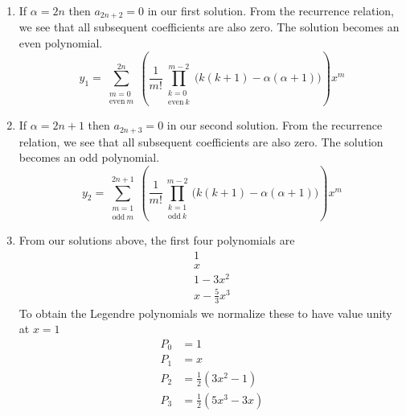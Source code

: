 {\begin{Solution}
\begin{enumerate}
\begin{gather*}
      \\
      \left| x^2 \right| < 1
    \end{gather*}
    Thus we see that the radius of convergence of the series is 1.  We
    knew that the radius of convergence would be at least one, because
    the nearest singularities of the coefficients of
    (\ref{eqn_legendre_eqn_norm}) occur at $x = \pm 1$, a distance of 1
    from the origin.  This implies that the solutions of the equation
    are analytic in the unit circle about $x = 0$.  The radius of
    convergence of the Taylor series expansion of an analytic function
    is the distance to the nearest singularity.
  \item
    If $\alpha = 2 n$ then $a_{2n+2} = 0$ in our first solution. From the
    recurrence relation, we see that all subsequent coefficients are also zero.
    The solution becomes an even polynomial.
    \[
    \boxed{
      y_1 = \sum_{\substack{m = 0 \\ \mathrm{even}\ m}}^{2n} \left( \frac{1}{m!}
        \prod_{\substack{k=0 \\ \mathrm{even}\ k}}^{m-2} \big( k (k+1) - \alpha (\alpha+1) \big) \right) x^m
      }
    \]
  \item
    If $\alpha = 2n+1$ then $a_{2n+3} = 0$ in our second solution. From the
    recurrence relation, we see that all subsequent coefficients are also zero.
    The solution becomes an odd polynomial.
    \[
    \boxed{
      y_2 = \sum_{\substack{m = 1 \\ \mathrm{odd}\ m}}^{2n+1} \left( \frac{1}{m!}
        \prod_{\substack{k=1 \\ \mathrm{odd}\ k}}^{m-2} \big( k (k+1) - \alpha (\alpha+1) \big) \right) x^m
      }
    \]
  \item
    From our solutions above, the first four polynomials are
    \begin{gather*}
      1 \\
      x \\
      1 - 3 x^2 \\
      x - \frac{5}{3} x^3
    \end{gather*}
    To obtain the Legendre polynomials we normalize these to have 
    value unity at $x = 1$
    \begin{align*}
      P_0 &= 1 \\
      P_1 &= x \\
      P_2 &= \frac{1}{2} \left( 3 x^2 - 1 \right) \\
      P_3 &= \frac{1}{2} \left( 5 x^3 - 3 x \right)

\end{align*}
\end{enumerate}
\end{Solution}}
